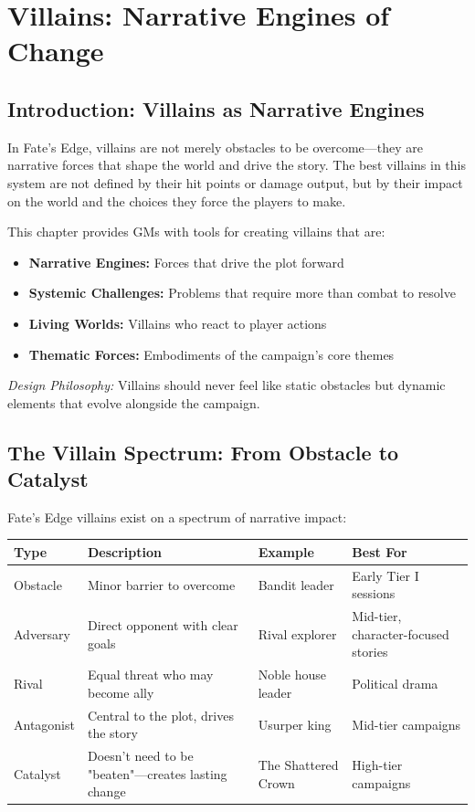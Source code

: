   \newpage

\section{Villains: Narrative Engines of Change}

\subsection{Introduction: Villains as Narrative Engines}

In Fate's Edge, villains are not merely obstacles to be overcome---they are narrative forces that shape the world and drive the story. The best villains in this system are not defined by their hit points or damage output, but by their impact on the world and the choices they force the players to make.

This chapter provides GMs with tools for creating villains that are:
\begin{itemize}
  \item \textbf{Narrative Engines:} Forces that drive the plot forward
  \item \textbf{Systemic Challenges:} Problems that require more than combat to resolve
  \item \textbf{Living Worlds:} Villains who react to player actions
  \item \textbf{Thematic Forces:} Embodiments of the campaign's core themes
\end{itemize}

\noindent\textit{Design Philosophy:} Villains should never feel like static obstacles but dynamic elements that evolve alongside the campaign.

\subsection{The Villain Spectrum: From Obstacle to Catalyst}

Fate's Edge villains exist on a spectrum of narrative impact:

\begin{center}
\begin{tabular}{|p{}|p{}|p{}|p{}|}
\hline
\textbf{Type} & \textbf{Description} & \textbf{Example} & \textbf{Best For} \\ \hline
Obstacle & Minor barrier to overcome & Bandit leader & Early Tier I sessions \\ \hline
Adversary & Direct opponent with clear goals & Rival explorer & Mid-tier, character-focused stories \\ \hline
Rival & Equal threat who may become ally & Noble house leader & Political drama \\ \hline
Antagonist & Central to the plot, drives the story & Usurper king & Mid-tier campaigns \\ \hline
Catalyst & Doesn't need to be "beaten"---creates lasting change & The Shattered Crown & High-tier campaigns \\ \hline
\end{tabular}
\end{center}

